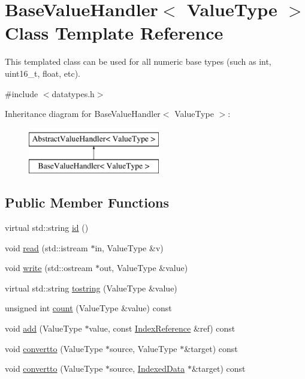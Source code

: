 \hypertarget{classBaseValueHandler}{}\section{Base\+Value\+Handler$<$ Value\+Type $>$ Class Template Reference}
\label{classBaseValueHandler}


This templated class can be used for all numeric base types (such as int, uint16\+\_\+t, float, etc).  




{\ttfamily \#include $<$datatypes.\+h$>$}

Inheritance diagram for Base\+Value\+Handler$<$ Value\+Type $>$\+:\begin{figure}[H]
\begin{center}
\leavevmode
\includegraphics[height=2.000000cm]{classBaseValueHandler}
\end{center}
\end{figure}
\subsection*{Public Member Functions}
\begin{DoxyCompactItemize}
\item 
virtual std\+::string \hyperlink{classBaseValueHandler_a7bc1637a355d28baa52bc3f1e069bfb7}{id} ()
\item 
void \hyperlink{classBaseValueHandler_ae55dd264dd8dcd4e9105a36fa8211df8}{read} (std\+::istream $\ast$in, Value\+Type \&v)
\item 
void \hyperlink{classBaseValueHandler_a56854e807c698507ddfeab331abd0482}{write} (std\+::ostream $\ast$out, Value\+Type \&value)
\item 
virtual std\+::string \hyperlink{classBaseValueHandler_a486eb004615965908cf2a5e670d55293}{tostring} (Value\+Type \&value)
\item 
unsigned int \hyperlink{classBaseValueHandler_a841fab906106fcfdef995e7b9c594ef4}{count} (Value\+Type \&value) const 
\item 
void \hyperlink{classBaseValueHandler_a260db19187a4f3fdd6dcf1fed7ac6a59}{add} (Value\+Type $\ast$value, const \hyperlink{classIndexReference}{Index\+Reference} \&ref) const 
\item 
void \hyperlink{classBaseValueHandler_a6b00505c99c8ba21309d8306e423a109}{convertto} (Value\+Type $\ast$source, Value\+Type $\ast$\&target) const 
\item 
void \hyperlink{classBaseValueHandler_aeb47f3d86de265e9c1ef5f4af39f941b}{convertto} (Value\+Type $\ast$source, \hyperlink{classIndexedData}{Indexed\+Data} $\ast$\&target) const 
\end{DoxyCompactItemize}
